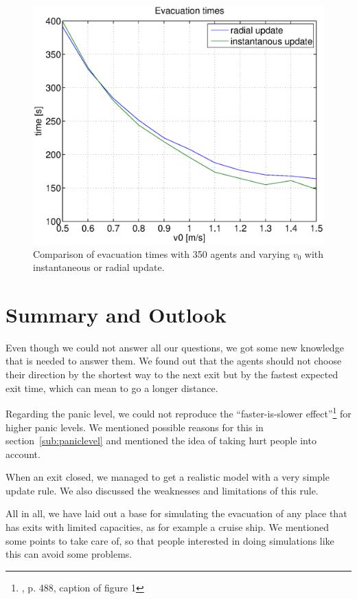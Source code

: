 \documentclass[11pt]{article}
\begin{document}
\begin{figure}[h]
	\centering
	\includegraphics[scale=0.5]{images/evactimescomparefew.eps}
	\caption{Comparison of evacuation times with 350 agents and varying \(v_0\) with instantaneous or radial update. 	}
	\label{evactimescomparefew}
\end{figure}

\FloatBarrier %

\section{Summary and Outlook}

Even though we could not answer all our questions, we got some new knowledge
that is needed to answer them. We found out that the agents should not choose
their direction by the shortest way to the next exit but by the fastest
expected exit time, which can mean to go a longer distance.

Regarding the panic level, we could not reproduce the ``faster-is-slower
effect''\footnote{\cite{helbing}, p. 488, caption of figure 1} for higher panic
levels. We mentioned possible reasons for this in section~\ref{sub:paniclevel}
and mentioned the idea of taking hurt people into account.

When an exit closed, we managed to get a realistic model with a very simple
update rule.  We also discussed the weaknesses and limitations of this rule.

All in all, we have laid out a base for simulating the evacuation of any place
that has exits with limited capacities, as for example a cruise ship.  We
mentioned some points to take care of, so that people interested in doing
simulations like this can avoid some problems.
\end{document}
